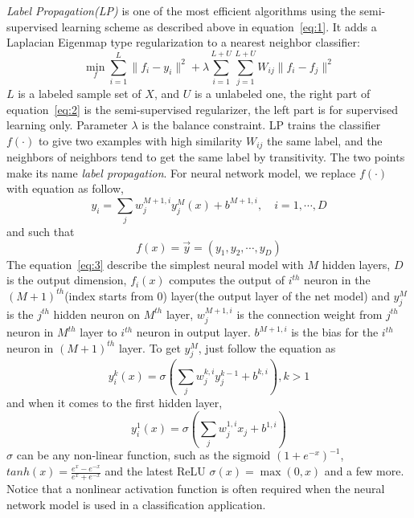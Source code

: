 \documentclass[3p,times,procedia]{elsarticle}
\begin{document}
\emph{Label Propagation(LP)}
\cite{zhu2002learning} 
is one of the most efficient algorithms using 
the semi-supervised learning scheme as 
described above in equation~\ref{eq:1}. 
It adds a Laplacian Eigenmap type 
regularization to a nearest neighbor 
classifier:
\begin{equation}
	\min_f\sum^L_{i=1}\|f_i-y_i\|^2+
	\lambda\sum^{L+U}_{i=1}\sum^{L+U}_{j=1}W_{ij}\|f_i-f_j\|^2
	\label{eq:2}
\end{equation}
$L$ is a labeled sample set of $X$, and $U$ is 
a unlabeled one, the right part of 
equation~\ref{eq:2} is the semi-supervised 
regularizer,
the left part is for supervised learning only.
Parameter $\lambda$ is the balance constraint. 
LP trains the classifier $f(\cdot)$ to give
two examples with high similarity $W_{ij}$
the same label, and the neighbors of neighbors
tend to get the same label by transitivity.
The two points make its name \emph{label
propagation}. For neural network model,
we replace $f(\cdot)$ with equation as follow,
\begin{equation}
	y_i=\sum_jw_j^{M+1,i}y^M_j(x)
	+b^{M+1,i},\quad i=1,\cdots,D
\label{eq:3}
\end{equation}
and such that
\begin{equation}
	f(x) = \vec{y}=
	\left(y_1,y_2,\cdots,y_D\right)
\label{eq:4}
\end{equation}
The equation~\ref{eq:3} describe the simplest 
neural model with $M$ hidden layers, $D$ is 
the output dimension, $f_i(x)$ computes the
output of $i^{th}$ neuron in the
$(M+1)^{th}$(index starts from 0) 
layer(the output layer of the net model) 
and $y^{M}_j$ is the $j^{th}$ hidden
neuron on $M^{th}$ layer, $w^{M+1,i}_j$
is the connection weight from $j^{th}$
neuron in $M^{th}$ layer to 
$i^{th}$ neuron in output layer.
$b^{M+1,i}$ is the bias for the $i^{th}$
neuron in $(M+1)^{th}$ layer.
To get $y_j^M$, just follow the equation as
\begin{equation}
	y^k_i(x) = \sigma\left(
		\sum_j w_j^{k,i}y_j^{k-1}
		+b^{k,i}
	\right),k>1
	\label{eq:5}
\end{equation}
and when it comes to the first hidden layer,
\begin{equation}
	y^1_i(x)=\sigma\left(\sum_jw_j^{1,i}x_j
	+b^{1,i}\right)
	\label{eq:6}
\end{equation}
$\sigma$ can be any non-linear function, such as
the sigmoid $\left(1+e^{-x}\right)^{-1}$, 
$tanh(x)=\frac{e^x-e^{-x}}{e^x+e^{-x}}$ and 
the latest ReLU $\sigma(x)=\max(0,x)$ and a few
more. Notice that a nonlinear activation
function is often required when the neural
network model is used in a classification
application.
\end{document}
